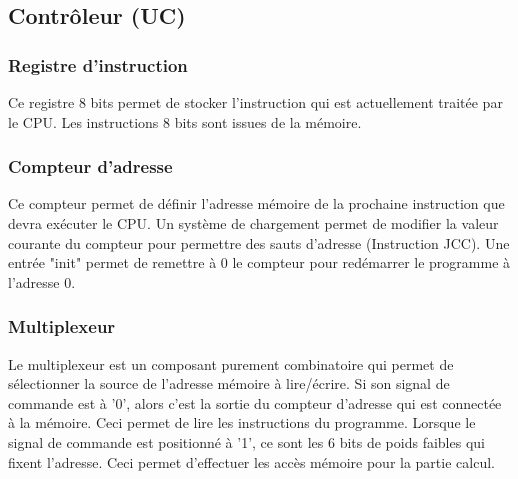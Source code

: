 \documentclass{article}
\begin{document}
    \subsection{Contrôleur (UC)}
    \subsubsection{Registre d'instruction}
    \par Ce registre 8 bits permet de stocker l'instruction qui est actuellement traitée par le CPU. Les instructions 8 bits sont issues de la mémoire. 
    \subsubsection{Compteur d'adresse}
    \par Ce compteur permet de définir l'adresse mémoire de la prochaine instruction que devra exécuter le CPU. Un système de chargement permet de modifier la valeur courante du compteur pour permettre des sauts d'adresse (Instruction JCC). Une entrée "init" permet de remettre à 0 le compteur pour redémarrer le programme à l'adresse 0.
    \subsubsection{Multiplexeur}
    \par Le multiplexeur est un composant purement combinatoire qui permet de sélectionner la source de l'adresse mémoire à lire/écrire. Si son signal de commande est à '0', alors c'est la sortie du compteur d'adresse qui est connectée à la mémoire. Ceci permet de lire les instructions du programme. Lorsque le signal de commande est positionné à '1', ce sont les 6 bits de poids faibles qui fixent l'adresse. Ceci permet d'effectuer les accès mémoire pour la partie calcul. 
\end{document}
